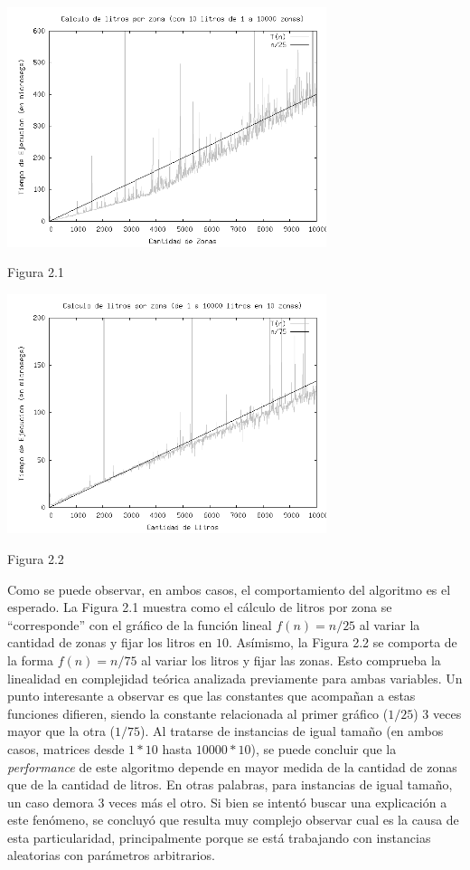 \documentclass[a4paper,11pt] {article}
\begin{document}
\begin{center}
 \includegraphics[width=0.7\textwidth]{Plots/Tp2Ej1-TiemposLitrosPorZonaPorZonas-10litros-bw.png}
\begin{center}
Figura 2.1
\end{center}
 \includegraphics[width=0.7\textwidth]{Plots/Tp2Ej1-TiemposLitrosPorZonaPorZonas-10zonas-bw.png}
\begin{center}
Figura 2.2
\end{center}
\end{center}

Como se puede observar, en ambos casos, el comportamiento del algoritmo es el esperado. La Figura 2.1 muestra como el c\'alculo de litros por zona se ``corresponde'' con el gr\'afico de la funci\'on lineal $f(n) = n/25$ al variar la cantidad de zonas y fijar los litros en $10$. As\'imismo, la Figura 2.2 se comporta de la forma $f(n) = n/75$ al variar los litros y fijar las zonas. Esto comprueba la linealidad en complejidad te\'orica analizada previamente para ambas variables. Un punto interesante a observar es que las constantes que acompañan a estas funciones difieren, siendo la constante relacionada al primer gr\'afico ($1/25$) 3 veces mayor que la otra ($1/75$). Al tratarse de instancias de igual tamaño (en ambos casos, matrices desde $1*10$ hasta $10000*10$), se puede concluir que la \textit{performance} de este algoritmo depende en mayor medida de la cantidad de zonas que de la cantidad de litros. En otras palabras, para instancias de igual tamaño, un caso demora 3 veces m\'as el otro. Si bien se intentó buscar una explicación a este fenómeno, se concluyó que resulta muy complejo observar cual es la causa de esta particularidad, principalmente porque se está trabajando con instancias aleatorias con parámetros arbitrarios.
\end{document}
